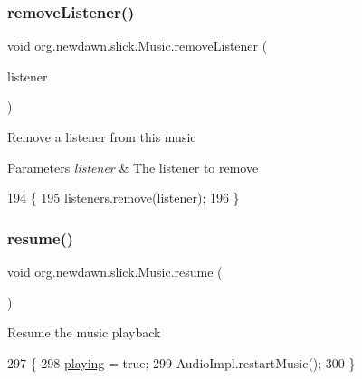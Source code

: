 \subsubsection{\texorpdfstring{remove\+Listener()}{removeListener()}}
{\footnotesize\ttfamily void org.\+newdawn.\+slick.\+Music.\+remove\+Listener (\begin{DoxyParamCaption}\item[{\mbox{\hyperlink{interfaceorg_1_1newdawn_1_1slick_1_1_music_listener}{Music\+Listener}}}]{listener }\end{DoxyParamCaption})\hspace{0.3cm}{\ttfamily [inline]}}

Remove a listener from this music


\begin{DoxyParams}{Parameters}
{\em listener} & The listener to remove \\
\hline
\end{DoxyParams}

\begin{DoxyCode}
194                                                        \{
195         \mbox{\hyperlink{classorg_1_1newdawn_1_1slick_1_1_music_ad57b22ce1f989d377f00f3c804a41db4}{listeners}}.remove(listener);
196     \}
\end{DoxyCode}
\mbox{\label{classorg_1_1newdawn_1_1slick_1_1_music_ac5a48d3b0d207d3740220190f4384033}} 
\subsubsection{\texorpdfstring{resume()}{resume()}}
{\footnotesize\ttfamily void org.\+newdawn.\+slick.\+Music.\+resume (\begin{DoxyParamCaption}{ }\end{DoxyParamCaption})\hspace{0.3cm}{\ttfamily [inline]}}

Resume the music playback 
\begin{DoxyCode}
297                          \{
298         \mbox{\hyperlink{classorg_1_1newdawn_1_1slick_1_1_music_a20709d497ca9027d874f7ffe970ce738}{playing}} = \textcolor{keyword}{true};
299         AudioImpl.restartMusic();
300     \}
\end{DoxyCode}
\mbox{\label{classorg_1_1newdawn_1_1slick_1_1_music_add55814269790879af02e9ce4309f26d}} 
